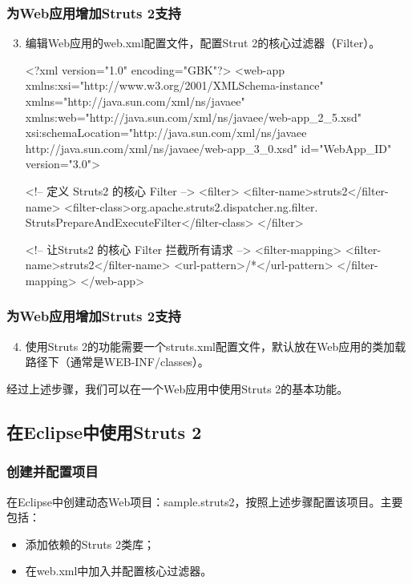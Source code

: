 \begin{frame}[fragile] %
  \frametitle{为Web应用增加Struts 2支持}
  
  \begin{enumerate}\setcounter{enumi}{2} %
  \item 编辑Web应用的web.xml配置文件，配置Strut 2的核心过滤器（Filter）。

    \begin{xmlCode}\footnotesize
      <?xml version="1.0" encoding="GBK"?>
      <web-app xmlns:xsi="http://www.w3.org/2001/XMLSchema-instance" 
      xmlns="http://java.sun.com/xml/ns/javaee" 
      xmlns:web="http://java.sun.com/xml/ns/javaee/web-app_2_5.xsd" 
      xsi:schemaLocation="http://java.sun.com/xml/ns/javaee 
      http://java.sun.com/xml/ns/javaee/web-app_3_0.xsd" 
      id="WebApp_ID" version="3.0">

        <!-- 定义 Struts2 的核心 Filter -->
        <filter>
          <filter-name>struts2</filter-name>
          <filter-class>org.apache.struts2.dispatcher.ng.filter.
            StrutsPrepareAndExecuteFilter</filter-class>
        </filter>
        
        <!-- 让Struts2 的核心 Filter 拦截所有请求 -->
        <filter-mapping>
          <filter-name>struts2</filter-name>
          <url-pattern>/*</url-pattern>
        </filter-mapping>
      </web-app>   
    \end{xmlCode}
\end{enumerate}
\end{frame}

\begin{frame}[fragile] %
  \frametitle{为Web应用增加Struts 2支持}

  \begin{enumerate}\setcounter{enumi}{3} %
  \item 使用Struts 2的功能需要一个struts.xml配置文件，默认放在Web应用的类加载路径下（通常是WEB-INF/classes）。
  \end{enumerate}

  经过上述步骤，我们可以在一个Web应用中使用Struts 2的基本功能。
\end{frame}

\subsection{在Eclipse中使用Struts 2}

\begin{frame}[fragile] %
  \frametitle{创建并配置项目}

  在Eclipse中创建动态Web项目：sample.struts2，按照上述步骤配置该项目。主要包括：

  \begin{itemize}
  \item 添加依赖的Struts 2类库；
  \item 在web.xml中加入并配置核心过滤器。
  \end{itemize}

\end{frame}

